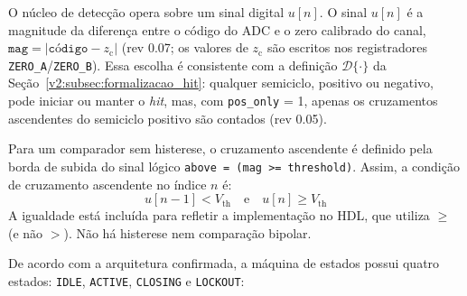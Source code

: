 O núcleo de detecção opera sobre um sinal digital \(u[n]\). O sinal \(u[n]\) é a magnitude da diferença entre o código do ADC e o zero calibrado do canal, \(\texttt{mag} = |\texttt{código} - z_{\mathrm{c}}|\) (rev 0.07; os valores de \(z_{\mathrm{c}}\) são escritos nos registradores \texttt{ZERO\_A}/\texttt{ZERO\_B}). Essa escolha é consistente com a definição \(\mathcal{D}\{\cdot\}\) da Seção~\ref{v2:subsec:formalizacao_hit}: qualquer semiciclo, positivo ou negativo, pode iniciar ou manter o \textit{hit}, mas, com \texttt{pos\_only} = 1, apenas os cruzamentos ascendentes do semiciclo positivo são contados (rev 0.05).

Para um comparador sem histerese, o cruzamento ascendente é definido pela borda de subida do sinal lógico \texttt{above = (mag >= threshold)}. Assim, a condição de cruzamento ascendente no índice \(n\) é:
\begin{equation}
	u[n-1] < V_{\mathrm{th}} \quad\text{e}\quad u[n] \ge V_{\mathrm{th}}
	\label{v2:eq:cruzamento_ascendente_secao4}
\end{equation}
A igualdade está incluída para refletir a implementação no HDL, que utiliza \(\ge\) (e não \(>\)). Não há histerese nem comparação bipolar.

De acordo com a arquitetura confirmada, a máquina de estados possui quatro estados: \texttt{IDLE}, \texttt{ACTIVE}, \texttt{CLOSING} e \texttt{LOCKOUT}:

